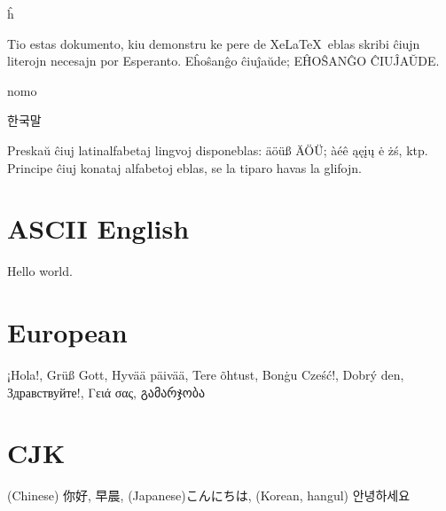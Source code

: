 \documentclass{article}
\begin{document}
    \^h

Tio estas dokumento, kiu demonstru ke pere de Xe\LaTeX\ eblas skribi ĉiujn
literojn necesajn por Esperanto. Eĥoŝanĝo ĉiuĵaŭde; EĤOŜANĜO ĈIUĴAŬDE.

{{nomo}}

한국말

Preskaŭ ĉiuj latinalfabetaj lingvoj disponeblas: äöüß ÄÖÜ; àéê ąęįų ė żś,
ktp. Principe ĉiuj konataj alfabetoj eblas, se la tiparo havas la glifojn.

\section{ASCII English}
Hello world.
\section{European}
¡Hola!, Grüß Gott, Hyvää päivää, Tere õhtust, Bonġu
          Cześć!, Dobrý den, Здравствуйте!, Γειά σας, გამარჯობა
\section{CJK}
(Chinese) 你好, 早晨, (Japanese)こんにちは, (Korean, hangul) 안녕하세요
\end{document}

